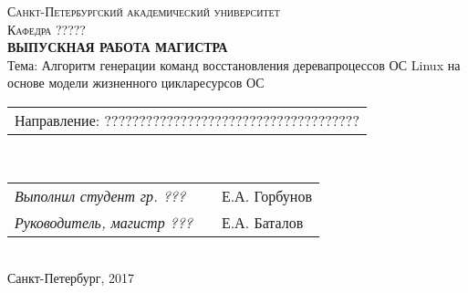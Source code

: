 \begin{titlepage}

\newcommand{\HRule}{\rule{\linewidth}{0.5mm}} %

\begin{center}
 

\textsc{Санкт-Петербургский академический университет \\ Кафедра ?????}\\[8cm]

{ \Large \bfseries ВЫПУСКНАЯ РАБОТА МАГИСТРА }\\
{ \large  Тема: Алгоритм генерации команд восстановления деревапроцессов ОС Linux на основе модели жизненного цикларесурсов ОС}\\[1.9cm]
 

\begin{minipage}{1\textwidth}
\begin{flushleft} \large

\begin{tabular}{l}
Направление: ?????????????????????????????????????
\end{tabular}
\\[0.5cm]
\begin{tabular}{lcl}
\emph{Выполнил студент гр. ???} & \underline{\hspace{3cm}} & Е.А. Горбунов\\
\emph{Руководитель, магистр ???} &  \underline{\hspace{3cm}} & Е.А. Баталов \\ %
\end{tabular}
\end{flushleft}
\end{minipage}\\[7.5cm]



{\large Санкт-Петербург, 2017}
\end{center} 

\end{titlepage}